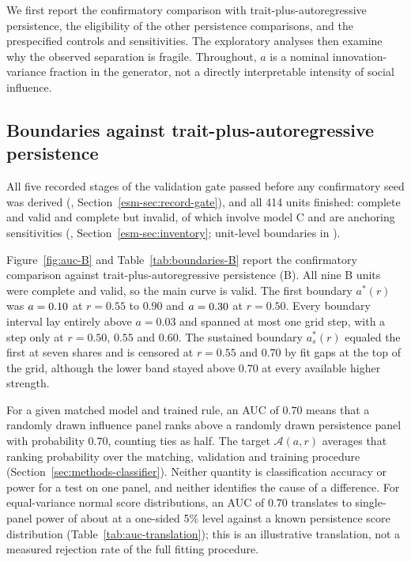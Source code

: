 We first report the confirmatory comparison with trait-plus-autoregressive persistence, the eligibility of the other persistence comparisons, and the prespecified controls and sensitivities. The exploratory analyses then examine why the observed separation is fragile. Throughout, $a$ is a nominal innovation-variance fraction in the generator, not a directly interpretable intensity of social influence.

\subsection{Boundaries against trait-plus-autoregressive persistence}\label{sec:results-B}

All five recorded stages of the validation gate passed before any confirmatory seed was derived (\esmresource, Section~\ref{esm-sec:record-gate}), and all 414 units finished:  complete and valid and  complete but invalid, of which  involve model C and  are anchoring sensitivities (\esmresource, Section~\ref{esm-sec:inventory}; unit-level boundaries in \allunitsresource).

Figure~\ref{fig:auc-B} and Table~\ref{tab:boundaries-B} report the confirmatory comparison against trait-plus-autoregressive persistence (B). All nine B units were complete and valid, so the main curve is valid. The first boundary $a^*(r)$ was $a=\resultnum{j.b.r055.first.point}{0.10}$ at $r=0.55$ to $0.90$ and $a=\resultnum{j.b.r050.first.point}{0.30}$ at $r=0.50$. Every boundary interval lay entirely above $a=0.03$ and spanned at most one grid step, with a step only at $r=0.50$, $0.55$ and $0.60$. The sustained boundary $a^*_s(r)$ equaled the first at seven shares and is censored at $r=0.55$ and $0.70$ by fit gaps at the top of the grid, although the lower band stayed above $0.70$ at every available higher strength.

For a given matched model and trained rule, an AUC of $0.70$ means that a randomly drawn influence panel ranks above a randomly drawn persistence panel with probability $0.70$, counting ties as half. The target $\mathcal A(a,r)$ averages that ranking probability over the matching, validation and training procedure (Section~\ref{sec:methods-classifier}). Neither quantity is classification accuracy or power for a test on one panel, and neither identifies the cause of a difference. For equal-variance normal score distributions, an AUC of $0.70$ translates to single-panel power of about  at a one-sided 5\% level against a known persistence score distribution (Table~\ref{tab:auc-translation}); this is an illustrative translation, not a measured rejection rate of the full fitting procedure.


